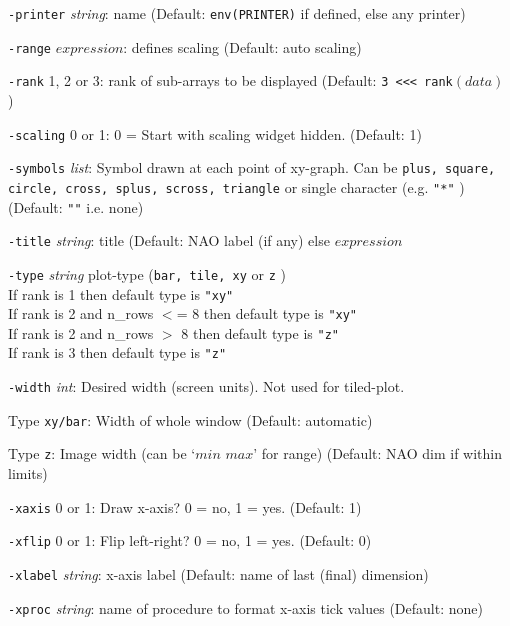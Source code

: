 \begin{simpleitems}
  \item
  \texttt{-printer} 
  \emph{string}: name (Default: 
  \texttt{env(PRINTER)} if defined, else any printer)
  \item
  \texttt{-range} $\mathit{expression}$:
  defines scaling (Default: auto scaling)
  \item
  \texttt{-rank} 1, 2 or 3: rank of sub-arrays to be displayed
  (Default: 
  \texttt{3 <<< rank}$(\mathit{data})$ )
  \item
  \texttt{-scaling} 0 or 1: 0 = Start with scaling widget hidden.
  (Default: 1)
  \item
  \texttt{-symbols} 
  \emph{list}: Symbol drawn at each point of xy-graph. Can be 
  \texttt{plus, square, circle, cross, splus, scross, triangle} or
  single character (e.g. 
  \texttt{"*"} ) (Default: 
  \texttt{""} i.e. none)
  \item
  \texttt{-title} 
  \emph{string}: title (Default: NAO label (if any) else $\mathit{expression}$
  \item
  \texttt{-type} 
  \emph{string} plot-type (\texttt{bar, tile, xy} or \texttt{z} )
	\\
	If rank is 1 then default type is \texttt{"xy"}
	\\
	If rank is 2 and n\_rows $<$= 8 then default type is \texttt{"xy"}
	\\
	If rank is 2 and n\_rows $>$ 8 then default type is \texttt{"z"}
	\\
	If rank is 3 then default type is \texttt{"z"}
  \item
  \texttt{-width} 
  \emph{int}: Desired width (screen units). Not used for tiled-plot.
\begin{bullets}
  \item  Type \texttt{xy/bar}: Width of whole window (Default: automatic)
  \item  Type \texttt{z}: Image width (can be `$\mathit{min}$ $\mathit{max}$' for range)
    (Default: NAO dim if within limits)
\end{bullets}
  \item
  \texttt{-xaxis} 0 or 1: Draw x-axis? 0 = no, 1 = yes. (Default: 1)
  \item
  \texttt{-xflip} 0 or 1: Flip left-right? 0 = no, 1 = yes.  (Default: 0)
  \item
  \texttt{-xlabel} \emph{string}: x-axis label (Default: name of last (final) dimension)
  \item
  \texttt{-xproc} \emph{string}: name of procedure to format x-axis tick values (Default: none)
  \item

\end{simpleitems}
